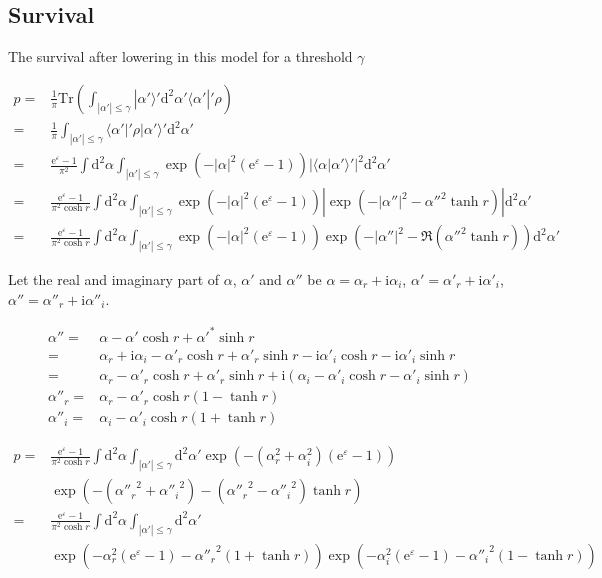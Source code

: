 \documentclass[10pt,fleqn]{article}
\newcommand{\ud}{\mathrm{d}}
\newcommand{\ue}{\mathrm{e}}
\newcommand{\ui}{\mathrm{i}}
\newcommand{\Tr}{\mathrm{Tr}}
\newcommand{\eqar}[1]
{
  \begin{align*}
    #1
  \end{align*}
}
\newcommand{\paren}[1]{{\left({#1}\right)}}
\newcommand{\abs}[1]{{\left|{#1}\right|}}
\begin{document}
\subsection{Survival}
The survival after lowering in this model for a threshold $\gamma$
\eqar{
  p=&\frac1\pi\Tr\paren{\int_{\abs{\alpha'}\leqslant\gamma}|\alpha'\rangle'\ud^2\alpha'\langle\alpha'|'\rho}\\
  =&\frac1\pi\int_{\abs{\alpha'}\leqslant\gamma}\langle\alpha'|'\rho|\alpha'\rangle'\ud^2\alpha'\\
  =&\frac{\ue^{\varepsilon} - 1}{\pi^2}\int\ud^2\alpha\int_{\abs{\alpha'}\leqslant\gamma}\exp\paren{-\abs{\alpha}^2\paren{\ue^{\varepsilon} - 1}} \abs{\langle\alpha|\alpha'\rangle'}^2\ud^2\alpha'\\
  =&\frac{\ue^{\varepsilon} - 1}{\pi^2\cosh r}\int\ud^2\alpha\int_{\abs{\alpha'}\leqslant\gamma}\exp\paren{-\abs{\alpha}^2\paren{\ue^{\varepsilon} - 1}} \abs{\exp\paren{-\abs{\alpha''}^2-\alpha''^2\tanh r}}\ud^2\alpha'\\
  =&\frac{\ue^{\varepsilon} - 1}{\pi^2\cosh r}\int\ud^2\alpha\int_{\abs{\alpha'}\leqslant\gamma}\exp\paren{-\abs{\alpha}^2\paren{\ue^{\varepsilon} - 1}}\exp\paren{-\abs{\alpha''}^2-\Re\paren{\alpha''^2\tanh r}}\ud^2\alpha'
}
Let the real and imaginary part of $\alpha$, $\alpha'$ and $\alpha''$ be $\alpha=\alpha_r+\ui\alpha_i$, $\alpha'=\alpha'_r+\ui\alpha'_i$, $\alpha''=\alpha''_r+\ui\alpha''_i$.
\eqar{
  \alpha''=&\alpha-\alpha'\cosh r+\alpha'^*\sinh r\\
  =&\alpha_r+\ui\alpha_i-\alpha'_r\cosh r+\alpha'_r\sinh r-\ui\alpha'_i\cosh r-\ui\alpha'_i\sinh r\\
  =&\alpha_r-\alpha'_r\cosh r+\alpha'_r\sinh r+\ui\paren{\alpha_i-\alpha'_i\cosh r-\alpha'_i\sinh r}\\
  \alpha''_r=&\alpha_r-\alpha'_r\cosh r\paren{1-\tanh r}\\
  \alpha''_i=&\alpha_i-\alpha'_i\cosh r\paren{1+\tanh r}
}
\eqar{
  p=&\frac{\ue^{\varepsilon} - 1}{\pi^2\cosh r}
  \int\ud^2\alpha\int_{\abs{\alpha'}\leqslant\gamma}\ud^2\alpha'
  \exp\paren{-\paren{\alpha_r^2+\alpha_i^2}\paren{\ue^{\varepsilon} - 1}}\\
  &\exp\paren{-\paren{{\alpha''_r}^2+{\alpha''_i}^2}-\paren{{\alpha''_r}^2-{\alpha''_i}^2}\tanh r}\\
  =&\frac{\ue^{\varepsilon} - 1}{\pi^2\cosh r}\int\ud^2\alpha\int_{\abs{\alpha'}\leqslant\gamma}\ud^2\alpha'\\
  &\exp\paren{-\alpha_r^2\paren{\ue^{\varepsilon} - 1}-{\alpha''_r}^2\paren{1+\tanh r}}
  \exp\paren{-\alpha_i^2\paren{\ue^{\varepsilon} - 1}-{\alpha''_i}^2\paren{1-\tanh r}}
}
\end{document}
